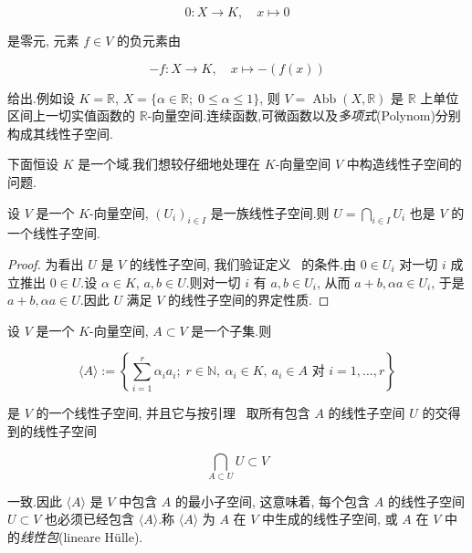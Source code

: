\[
0 \colon X \longrightarrow K, \quad x \longmapsto 0
\]

是零元, 元素 $f \in V$ 的负元素由

\[
-f \colon X \longrightarrow K, \quad x \longmapsto -(f(x))
\]

给出.例如设 $K = \mathbb{R}$, $X = \{\alpha \in \mathbb{R};\; 0 \leq \alpha \leq 1\}$, 则 $V = \operatorname{Abb}(X, \mathbb{R})$ 是 $\mathbb{R}$ 上单位区间上一切实值函数的 $\mathbb{R}$-向量空间.连续函数,可微函数以及\emph{多项式}(\textup{Polynom})分别构成其线性子空间.

下面恒设 $K$ 是一个域.我们想较仔细地处理在 $K$-向量空间 $V$ 中构造线性子空间的问题.

\begin{lemma}\label{lem:1.4.4}
设 $V$ 是一个 $K$-向量空间, $(U_i)_{i \in I}$ 是一族线性子空间.则 $U = \bigcap_{i \in I} U_i$ 也是 $V$ 的一个线性子空间.
\end{lemma}

\begin{proof}
为看出 $U$ 是 $V$ 的线性子空间, 我们验证定义~ 的条件.由 $0 \in U_i$ 对一切 $i$ 成立推出 $0 \in U$.设 $\alpha \in K$, $a, b \in U$.则对一切 $i$ 有 $a, b \in U_i$, 从而 $a + b, \alpha a \in U_i$, 于是 $a + b, \alpha a \in U$.因此 $U$ 满足 $V$ 的线性子空间的界定性质.
\end{proof}

\begin{definition-theorem}[生成的线性子空间]\label{std:1.4.5}
设 $V$ 是一个 $K$-向量空间, $A \subset V$ 是一个子集.则

\[
\langle A \rangle := \left\{\sum_{i = 1}^{r} \alpha_i a_i;\; r \in \mathbb{N},\ \alpha_i \in K,\ a_i \in A \text{ 对 } i = 1, \ldots, r\right\}
\]

是 $V$ 的一个线性子空间, 并且它与按引理~ 取所有包含 $A$ 的线性子空间 $U$ 的交得到的线性子空间

\[
\bigcap_{A \subset U} U \subset V
\]

一致.因此 $\langle A \rangle$ 是 $V$ 中包含 $A$ 的最小子空间, 这意味着, 每个包含 $A$ 的线性子空间 $U \subset V$ 也必须已经包含 $\langle A \rangle$.称 $\langle A \rangle$ 为 $A$ 在 $V$ 中生成的线性子空间, 或 $A$ 在 $V$ 中的\emph{线性包}(\textup{lineare Hülle}).
\end{definition-theorem}

